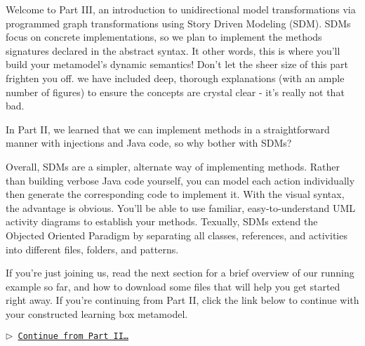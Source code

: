 \genHeader
{}

Welcome to Part III, an introduction to unidirectional model transformations via programmed graph transformations using Story Driven Modeling (SDM).
SDMs focus on concrete implementations, so we plan to implement the methods signatures declared in the abstract syntax. It other words, this is where you'll
build your metamodel's dynamic semantics! Don't let the sheer size of this part frighten you off. we have included deep, thorough explanations (with an ample
number of figures) to ensure the concepts are crystal clear - it's really not that bad.

In Part II, we learned that we can implement methods in a straightforward manner with injections and Java code, so why bother with SDMs? 

Overall, SDMs are a simpler, alternate way of implementing methods. Rather than building verbose Java code yourself, you can model each action individually then
generate the corresponding code to implement it. With the visual syntax, the advantage is obvious. You'll be able to use familiar, easy-to-understand UML
activity diagrams to establish your methods. Texually, SDMs extend the Objected Oriented Paradigm by separating all classes, references, and activities into
different files, folders, and patterns.

If you're just joining us, read the next section for a brief overview of our running example so far, and how to download some files that will help you get
started right away. If you're continuing from Part II, click the link below to continue with your constructed learning box metamodel.

\begin{center}\texttt{$\triangleright$ \hyperlink{explanation}{Continue from Part II\ldots}}\end{center}
